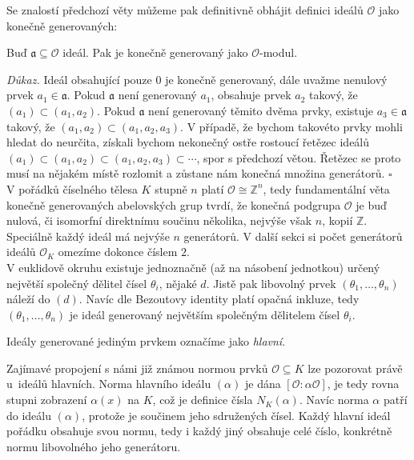 \documentclass [12pt]{report}
\begin{document}
Se znalostí předchozí věty můžeme pak definitivně obhájit definici ideálů $\mathcal{O}$ jako konečně generovaných:
 \begin{veta}
 Buď $\mathfrak{a} \subseteq \mathcal{O}$ ideál. Pak je konečně generovaný jako $\mathcal{O}$-modul.
 \end{veta}
\noindent \textit{Důkaz.} Ideál obsahující pouze $0$ je konečně generovaný, dále uvažme nenulový prvek $a_1 \in \mathfrak{a}$. Pokud $\mathfrak{a}$ není generovaný $a_1$, obsahuje prvek $a_2$ takový, že $(a_1) \subset (a_1,a_2)$. Pokud $\mathfrak{a}$ není generovaný těmito dvěma prvky, existuje $a_3 \in \mathfrak{a}$ takový, že $(a_1,a_2) \subset (a_1,a_2,a_3)$. V případě, že bychom takovéto prvky mohli hledat do neurčita, získali bychom nekonečný ostře rostoucí řetězec ideálů $(a_1) \subset (a_1,a_2) \subset (a_1,a_2,a_3) \subset \cdots$, spor s předchozí větou. Řetězec se proto musí na nějakém místě rozlomit a zůstane nám konečná množina generátorů. \hfill $\square$\\


V pořádků číselného tělesa $K$ stupně $n$ platí $\mathcal{O} \cong \mathbb{Z}^{n}$, tedy fundamentální věta konečně generovaných abelovských grup tvrdí, že konečná podgrupa $\mathcal{O}$ je buď nulová, či isomorfní direktnímu součinu několika, nejvýše však $n$, kopií $\mathbb{Z}$. Speciálně každý ideál má nejvýše $n$ generátorů. V další sekci si počet generátorů ideálů $\mathcal{O}_K$ omezíme dokonce číslem $2$.\\

V euklidově okruhu existuje jednoznačně (až na násobení jednotkou) určený největší společný dělitel čísel $\theta_i$, nějaké $d$. Jistě pak libovolný prvek $(\theta_1,\dots,\theta_n)$ náleží do $(d)$. Navíc dle Bezoutovy identity platí opačná inkluze, tedy $(\theta_1,\dots,\theta_n)$ je ideál generovaný největším společným dělitelem čísel $\theta_i$.  

\begin{definice}
Ideály generované jediným prvkem označíme jako \textit{hlavní}.
\end{definice}

Zajímavé propojení s námi již známou normou prvků $\mathcal{O} \subseteq K$ lze pozorovat právě u~ideálů hlavních. Norma hlavního ideálu $(\alpha)$ je dána $[\mathcal{O}:\alpha \mathcal{O}]$, je tedy rovna stupni zobrazení $\alpha(x)$ na $K$, což je definice čísla $N_K(\alpha)$. Navíc norma $\alpha$ patří do ideálu $(\alpha)$, protože je součinem jeho sdružených čísel. Každý hlavní ideál pořádku obsahuje svou normu, tedy i každý jiný obsahuje celé číslo, konkrétně normu libovolného jeho generátoru.\\
\end{document}
